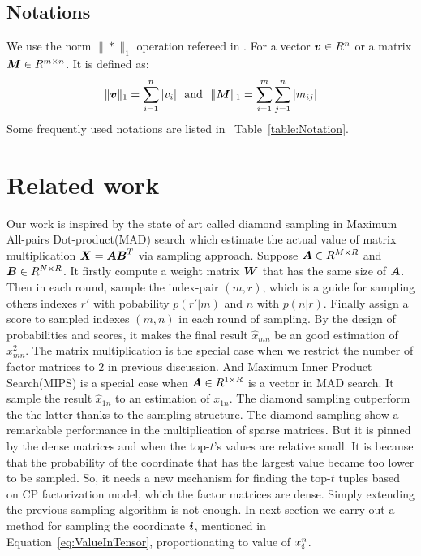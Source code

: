 \documentclass[letterpaper]{article}
\newcommand{\V}[1]{{\bm{{\MakeLowercase{#1}}}}}
\newcommand{\M}[1]{{\bm{{\MakeUppercase{#1}}}}}
\newcommand{\norm}[2]{\|#1\|_{#2}}
\newcommand{\Eqn}[1]   {Equation~\ref{eq:#1}}
\newcommand{\Table}[1] {Table~\ref{table:#1}}
\begin{document}
\subsection{Notations}

We use the norm $\norm{*}{1}$ operation refereed in \cite{BaPiKoSe15}.
For a vector $\V{v}\in R^n$ or a matrix $\M{M}\in R^{m\times n}$.
It is defined as:
\[
    \norm{\V{v}}{1} = \sum_{i=1}^{n}|v_i|
    \ \  {\rm and} \ \
    \norm{\M{M}}{1} = \sum_{i=1}^{m}\sum_{j=1}^{n}|m_{ij}|
\]
Some frequently used notations are listed in ~\Table{Notation}.


\section{Related work}
Our work is inspired by the state of art called diamond sampling
in Maximum All-pairs Dot-product(MAD) search\cite{BaPiKoSe15}
which estimate the actual value of matrix multiplication
$\M{X} = \M{A}\M{B}^T$ via sampling approach.
Suppose $\M{A}\in R^{M\times R}$ and $\M{B}\in R^{N\times R}$.
It firstly compute a weight matrix $\M{W}$ that has the same size of $\M{A}$.
Then in each round, sample the index-pair $(m,r)$,
which is a guide for sampling others indexes $r'$ with pobability
$p(r'|m)$ and $n$ with $p(n|r)$.
Finally assign a score to sampled indexes ${(m,n)}$ in each round of sampling.
By the design of probabilities and scores,
it makes the final result $\widehat{x}_{mn}$ be an good estimation of $x^2_{mn}$.
The matrix multiplication is the special case
when we restrict the number of factor matrices to $2$ in previous discussion.
And Maximum Inner Product Search(MIPS)\cite{Cohen97,Ram12}
is a special case when $\M{A}\in R^{1\times R}$ is a vector in MAD search.
It sample the result $\widehat{x}_{1n}$ to an estimation of $x_{1n}$.
The diamond sampling outperform the the latter thanks to the sampling structure.
The diamond sampling show a remarkable performance in the multiplication of sparse matrices.
But it is pinned by the dense matrices and when the top-$t$'s values are relative small.
It is because that the probability of the coordinate that has the largest value became too lower
to be sampled.
So, it needs a new mechanism for finding the top-$t$ tuples based on CP factorization model,
which the factor matrices are dense.
Simply extending the previous sampling algorithm is not enough.
In next section we carry out a method for sampling the coordinate $\V{i}$,
mentioned in \Eqn{ValueInTensor},
proportionating to value of $x^n_{\V{i}}$.
\end{document}

